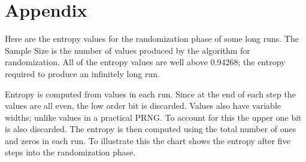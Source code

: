 \documentclass[letterpaper]{article}
\begin{document}
\begin{multicols}{2}
\end{multicols}

\newpage

\appendix

\section*{Appendix}

Here are the entropy values for the randomization phase of some long runs. The Sample Size is the number of values produced by the algorithm for randomization. All of the entropy values are well above 0.94268; the entropy required to produce an infinitely long run.

Entropy is computed from values in each run. Since at the end of each step the values are all even, the low order bit is discarded. Values also have variable widths; unlike values in a practical PRNG. To account for this the upper one bit is also discarded. The entropy is then computed using the total number of ones and zeros in each run. To illustrate this the chart shows the entropy after five steps into the randomization phase.
\end{document}
